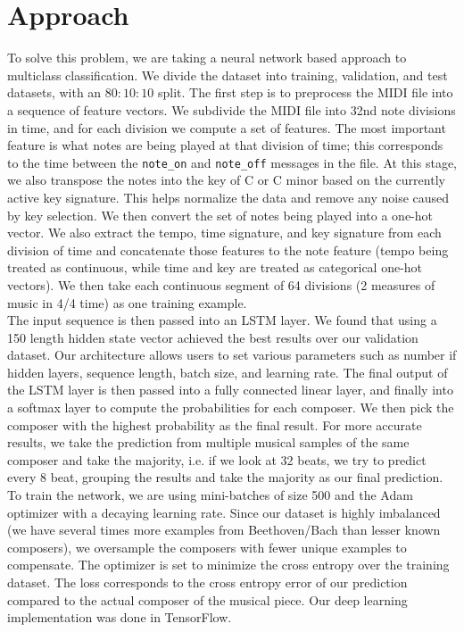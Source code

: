 \documentclass[11pt,a4paper]{article}
\begin{document}
\section{Approach}
To solve this problem, we are taking a neural network based approach to multiclass classification. We divide the dataset into training, validation, and test datasets, with an $80:10:10$ split. The first step is to preprocess the MIDI file into a sequence of feature vectors. We subdivide the MIDI file into 32nd note divisions in time, and for each division we compute a set of features. The most important feature is what notes are being played at that division of time; this corresponds to the time between the \texttt{note\_on}  and \texttt{note\_off}  messages in the file. At this stage, we also transpose the notes into the key of C or C minor based on the currently active key signature. This helps normalize the data and remove any noise caused by key selection. We then convert the set of notes being played into a one-hot vector. We also extract the tempo, time signature, and key signature from each division of time and concatenate those features to the note feature (tempo being treated as continuous, while time and key are treated as categorical one-hot vectors). We then take each continuous  segment of 64 divisions (2 measures of music in 4/4 time) as one training example.\\
The input sequence is then passed into an LSTM layer. We found that using a 150 length hidden state vector achieved the best results over our validation dataset. Our architecture allows users to set various parameters such as number if hidden layers, sequence length, batch size, and learning rate. The final output of the LSTM layer is then passed into a fully connected linear layer, and finally into a softmax layer to compute the probabilities for each composer. We then pick the composer with the highest probability as the final result. For more accurate results, we take the prediction from multiple musical samples of the same composer and take the majority, i.e. if we look at 32 beats, we try to predict every 8 beat, grouping the results and take the majority as our final prediction. \\
To train the network, we are using mini-batches of size 500 and the Adam optimizer with a decaying learning rate. Since our dataset is highly imbalanced (we have several times more examples from Beethoven/Bach than lesser known composers), we oversample the composers with fewer unique examples to compensate. The optimizer is set to minimize the cross entropy over the training dataset. The loss corresponds to the cross entropy error of our prediction compared to the actual composer of the musical piece. Our deep learning implementation was done in TensorFlow.\\
\end{document}
